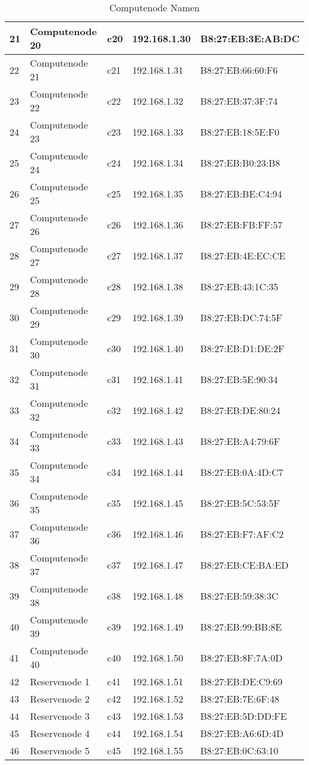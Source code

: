 \begin{table}[H]
\begin{tabular}{p{1cm}p{3cm}p{3cm}p{4cm}p{4cm}}
21 & Computenode 20 & c20 & 192.168.1.30 & B8:27:EB:3E:AB:DC\\\hline
22 & Computenode 21 & c21 & 192.168.1.31 & B8:27:EB:66:60:F6\\\hline
23 & Computenode 22 & c22 & 192.168.1.32 & B8:27:EB:37:3F:74\\\hline
24 & Computenode 23 & c23 & 192.168.1.33 & B8:27:EB:18:5E:F0\\\hline
25 & Computenode 24 & c24 & 192.168.1.34 & B8:27:EB:B0:23:B8\\\hline
26 & Computenode 25 & c25 & 192.168.1.35 & B8:27:EB:BE:C4:94\\\hline
27 & Computenode 26 & c26 & 192.168.1.36 & B8:27:EB:FB:FF:57\\\hline
28 & Computenode 27 & c27 & 192.168.1.37 & B8:27:EB:4E:EC:CE\\\hline
29 & Computenode 28 & c28 & 192.168.1.38 & B8:27:EB:43:1C:35\\\hline
30 & Computenode 29 & c29 & 192.168.1.39 & B8:27:EB:DC:74:5F\\\hline
31 & Computenode 30 & c30 & 192.168.1.40 & B8:27:EB:D1:DE:2F\\\hline
32 & Computenode 31 & c31 & 192.168.1.41 & B8:27:EB:5E:90:34\\\hline
33 & Computenode 32 & c32 & 192.168.1.42 & B8:27:EB:DE:80:24\\\hline
34 & Computenode 33 & c33 & 192.168.1.43 & B8:27:EB:A4:79:6F\\\hline
35 & Computenode 34 & c34 & 192.168.1.44 & B8:27:EB:0A:4D:C7\\\hline
36 & Computenode 35 & c35 & 192.168.1.45 & B8:27:EB:5C:53:5F\\\hline
37 & Computenode 36 & c36 & 192.168.1.46 & B8:27:EB:F7:AF:C2\\\hline
38 & Computenode 37 & c37 & 192.168.1.47 & B8:27:EB:CE:BA:ED\\\hline
39 & Computenode 38 & c38 & 192.168.1.48 & B8:27:EB:59:38:3C\\\hline
40 & Computenode 39 & c39 & 192.168.1.49 & B8:27:EB:99:BB:8E\\\hline
41 & Computenode 40 & c40 & 192.168.1.50 & B8:27:EB:8F:7A:0D\\\hline
42 & Reservenode 1 & c41 & 192.168.1.51 & B8:27:EB:DE:C9:69\\\hline
43 & Reservenode 2 & c42 & 192.168.1.52 & B8:27:EB:7E:6F:48\\\hline
44 & Reservenode 3 & c43 & 192.168.1.53 & B8:27:EB:5D:DD:FE\\\hline
45 & Reservenode 4 & c44 & 192.168.1.54 & B8:27:EB:A6:6D:4D\\\hline
46 & Reservenode 5 & c45 & 192.168.1.55 & B8:27:EB:0C:63:10\\\hline
\end{tabular}
\caption{Computenode Namen}
\end{table}